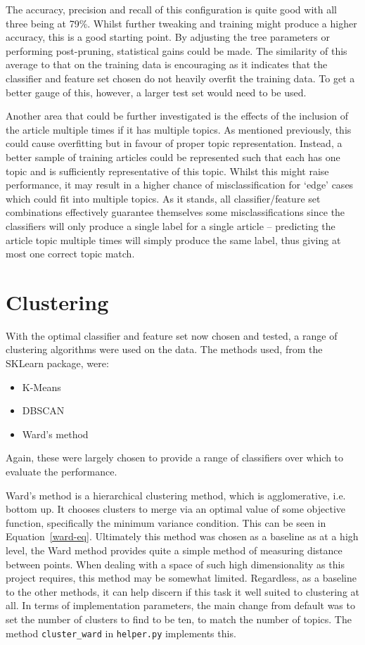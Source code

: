 \documentclass[11pt]{article}
\begin{document}
The accuracy, precision and recall of this configuration is quite good with all three being at 79\%. Whilst further tweaking and training might produce a higher accuracy, this is a good starting point. By adjusting the tree parameters or performing post-pruning, statistical gains could be made. The similarity of this average to that on the training data is encouraging as it indicates that the classifier and feature set chosen do not heavily overfit the training data. To get a better gauge of this, however, a larger test set would need to be used.

Another area that could be further investigated is the effects of the inclusion of the article multiple times if it has multiple topics. As mentioned previously, this could cause overfitting but in favour of proper topic representation. Instead, a better sample of training articles could be represented such that each has one topic and is sufficiently representative of this topic. Whilst this might raise performance, it may result in a higher chance of misclassification for ‘edge’ cases which could fit into multiple topics. As it stands, all classifier/feature set combinations effectively guarantee themselves some misclassifications since the classifiers will only produce a single label for a single article – predicting the article topic multiple times will simply produce the same label, thus giving at most one correct topic match.

\section{Clustering}
With the optimal classifier and feature set now chosen and tested, a range of clustering algorithms were used on the data. The methods used, from the SKLearn package, were:
\begin{itemize}
\item K-Means~\cite{kmeans}
\item DBSCAN~\cite{dbscan}
\item Ward's method~\cite{wards-meth}
\end{itemize}
Again, these were largely chosen to provide a range of classifiers over which to evaluate the performance. 

Ward's method is a hierarchical clustering method, which is agglomerative, i.e. bottom up. It chooses clusters to merge via an optimal value of some objective function, specifically the minimum variance condition. This can be seen in Equation~\ref{ward-eq}. Ultimately this method was chosen as a baseline as at a high level, the Ward method provides quite a simple method of measuring distance between points. When dealing with a space of such high dimensionality as this project requires, this method may be somewhat limited. Regardless, as a baseline to the other methods, it can help discern if this task it well suited to clustering at all. In terms of implementation parameters, the main change from default was to set the number of clusters to find to be ten, to match the number of topics. The method \texttt{cluster\_ward} in \texttt{helper.py} implements this.
\end{document}

